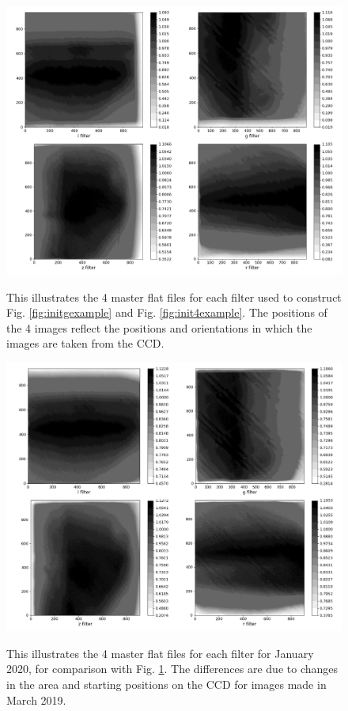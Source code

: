 \begin{figure}[!htbp]
\begin{center}
\includegraphics[scale=0.4]{images/mastflateg0918.png}
\end{center}   
\caption{This illustrates the 4 master flat files for each filter used to
construct Fig. \ref{fig:initgexample} and Fig. \ref{fig:init4example}. The
positions of the 4 images reflect the positions and orientations in which the
images are taken from the CCD.}
\protect\label{fig:mastfeg0918}
\end{figure}

\begin{figure}[!htbp]
\begin{center}
\includegraphics[scale=0.4]{images/mastflateg0120.png}
\end{center}   
\caption{This illustrates the 4 master flat files for each filter for January
2020, for comparison with Fig. \ref{fig:mastfeg0918}. The differences are due
to changes in the area and starting positions on the CCD for images made in
March 2019.} \protect\label{fig:mastfeg0120}
\end{figure}

